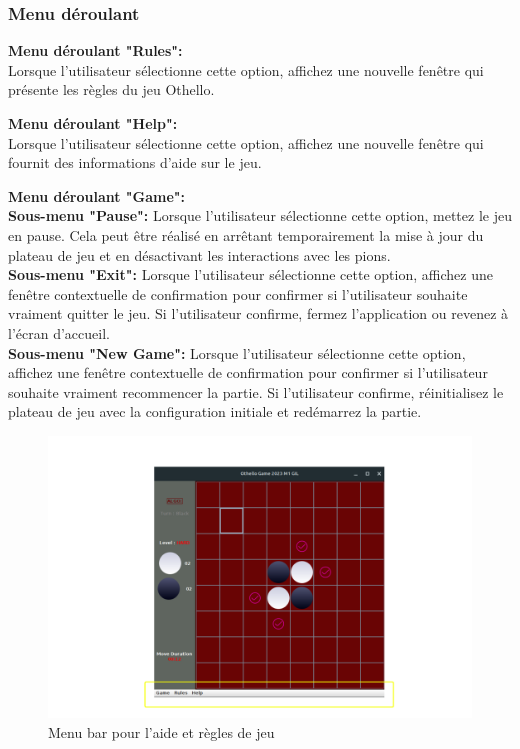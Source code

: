 \documentclass[12pt]{article}
\begin{document}
\newpage
\subsubsection{Menu déroulant}
\textbf{Menu déroulant "Rules":}\\
Lorsque l'utilisateur sélectionne cette option, affichez une nouvelle fenêtre qui présente les règles du jeu Othello.

\textbf{Menu déroulant "Help":}\\
Lorsque l'utilisateur sélectionne cette option, affichez une nouvelle fenêtre qui fournit des informations d'aide sur le jeu.

\textbf{Menu déroulant "Game":}\\ 
\textbf{Sous-menu "Pause":} Lorsque l'utilisateur sélectionne cette option, mettez le jeu en pause. Cela peut être réalisé en arrêtant temporairement la mise à jour du plateau de jeu et en désactivant les interactions avec les pions.\\
\textbf{Sous-menu "Exit":} Lorsque l'utilisateur sélectionne cette option, affichez une fenêtre contextuelle de confirmation pour confirmer si l'utilisateur souhaite vraiment quitter le jeu. Si l'utilisateur confirme, fermez l'application ou revenez à l'écran d'accueil.\\
\textbf{Sous-menu "New Game":} Lorsque l'utilisateur sélectionne cette option, affichez une fenêtre contextuelle de confirmation pour confirmer si l'utilisateur souhaite vraiment recommencer la partie. Si l'utilisateur confirme, réinitialisez le plateau de jeu avec la configuration initiale et redémarrez la partie.

	\begin{figure}[H]
	\centering
	\includegraphics[scale=0.3]{img/rule.png}
	\caption{Menu bar pour l'aide et règles de jeu}
	\label{rules_aide}
\end{figure}
\end{document}
